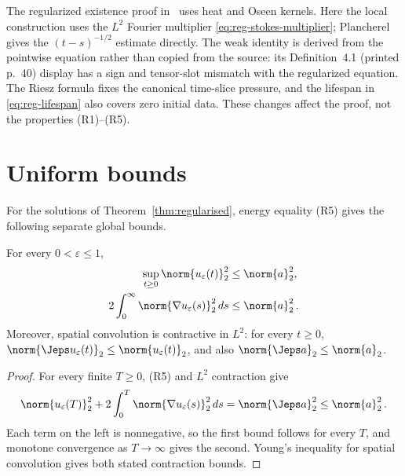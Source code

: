 \documentclass[11pt,reqno]{amsart}
\begin{document}
\begin{remark}
The regularized existence proof in~\cite[Theorem~4.2, p.~41]{OzanskiPooley2018}
uses heat and Oseen kernels. Here the local construction uses the $L^2$ Fourier
multiplier \eqref{eq:reg-stokes-multiplier}; Plancherel gives the
$(t-s)^{-1/2}$ estimate directly. The weak identity is derived from the
pointwise equation rather than copied from the source: its Definition~4.1 (printed p.~40)
display has a sign and tensor-slot mismatch with the regularized equation.
The Riesz formula fixes the canonical time-slice pressure,
and the lifespan in \eqref{eq:reg-lifespan} also covers zero initial data.
These changes affect the proof, not the properties (R1)--(R5).
\end{remark}

\section{Uniform bounds}\label{sec:uniform}


For the solutions of Theorem~\ref{thm:regularised}, energy equality (R5) gives
the following separate global bounds.
\begin{lemma}\label{lem:reg-energy}
For every $0<\varepsilon\leq1$,
\begin{equation}\label{eq:reg-energy-consequences}
\begin{aligned}
  \sup_{t\geq0}\norm{u_\varepsilon(t)}_2^2&\leq\norm{a}_2^2,\\
  2\int_0^\infty\norm{\nabla u_\varepsilon(s)}_2^2\,ds
       &\leq\norm{a}_2^2\,.
\end{aligned}
\end{equation}
Moreover, spatial convolution is contractive in $L^2$: for every $t\geq0$,
$\norm{\Jeps u_\varepsilon(t)}_2\leq\norm{u_\varepsilon(t)}_2$, and also
$\norm{\Jeps a}_2\leq\norm{a}_2$.
\end{lemma}
\begin{proof}
For every finite $T\geq0$, (R5) and $L^2$ contraction give
\begin{equation*}
  \norm{u_\varepsilon(T)}_2^2
  +2\int_0^T\norm{\nabla u_\varepsilon(s)}_2^2\,ds
  =\norm{\Jeps a}_2^2\leq\norm{a}_2^2\,.
\end{equation*}
Each term on the left is nonnegative, so the first bound follows for every
$T$, and monotone convergence as $T\to\infty$ gives the second. Young's
inequality for spatial convolution gives both stated contraction bounds.
\end{proof}
\end{document}
